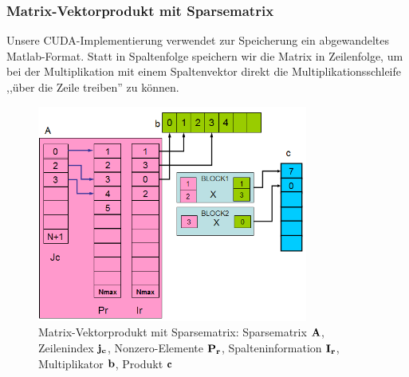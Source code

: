 
\subsubsection{Matrix-Vektorprodukt mit Sparsematrix}





Unsere CUDA-Implementierung verwendet zur Speicherung ein abgewandeltes
Matlab-Format. Statt in Spaltenfolge speichern wir die Matrix
in Zeilenfolge, um bei der Multiplikation mit einem Spaltenvektor direkt
die Multiplikationsschleife ,,über die Zeile treiben'' zu können.

\begin{figure}[htbp]
\includegraphics[width=3.5in]{../xby/pic//sparseMul}
\caption{Matrix-Vektorprodukt mit Sparsematrix: Sparsematrix $\bf A $, Zeilenindex $ \bf j_c$, Nonzero-Elemente $\bf P_r$,  Spalteninformation $ \bf I_r$, Multiplikator $\bf b$, Produkt $\bf c$}
\label{sparseMul}
\end{figure}